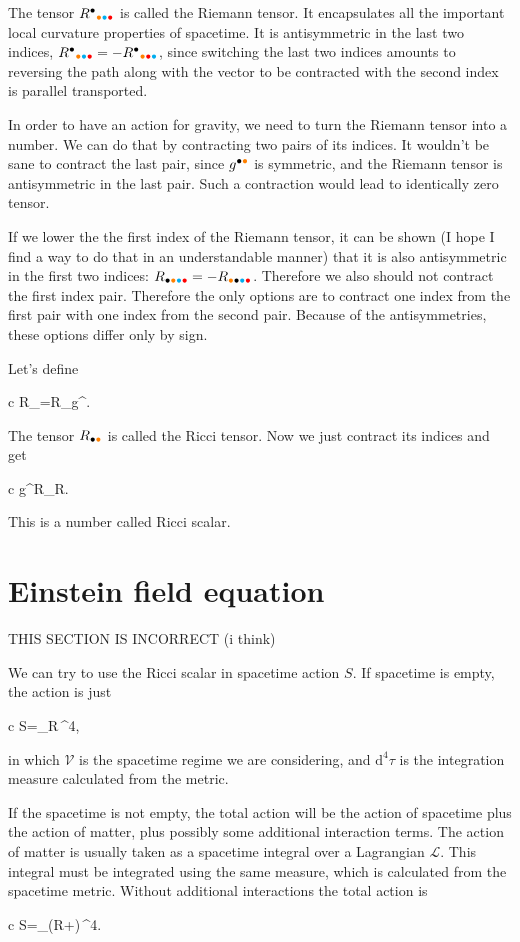 \documentclass[11pt,oneside%
]{memoir}
\newenvironment{eqna}{\begin{IEEEeqnarray*}{c}}{\end{IEEEeqnarray*}\ignorespacesafterend}
\newcommand{\dd}{\mathrm{d}}
\newcommand{\coa}{{\color{black}\bullet}}
\newcommand{\cob}{{\color{oranssi}\bullet}}
\newcommand{\coc}{{\color{cyan}\bullet}}
\newcommand{\cod}{{\color{red}\bullet}}
\begin{document}
The tensor \(R^\coa_{\cob\coc\cod}\) is called the Riemann tensor. It encapsulates all the important local curvature properties of spacetime. It is antisymmetric in the last two indices, \(R^\coa_{\cob\coc\cod}=-R^\coa_{\cob\cod\coc}\), since switching the last two indices amounts to reversing the path along with the vector to be contracted with the second index is parallel transported.

In order to have an action for gravity, we need to turn the Riemann tensor into a number. We can do that by contracting two pairs of its indices. It wouldn't be sane to contract the last pair, since \(g^{\coa\cob}\) is symmetric, and the Riemann tensor is antisymmetric in the last pair. Such a contraction would lead to identically zero tensor.

If we lower the the first index of the Riemann tensor, it can be shown (I hope I find a way to do that in an understandable manner) that it is also antisymmetric in the first two indices: \(R_{\coa\cob\coc\cod}=-R_{\cob\coa\coc\cod}\). Therefore we also should not contract the first index pair. Therefore the only options are to contract one index from the first pair with one index from the second pair. Because of the antisymmetries, these options differ only by sign.

Let's define
\begin{eqna}
R_{\coa\cob}=R_{\coa\coc\cod\cob}g^{\coc\cod}.
\end{eqna}
The tensor \(R_{\coa\cob}\) is called the Ricci tensor. Now we just contract its indices and get
\begin{eqna}
g^{\coa\cob}R_{\coa\cob}\doteq R.
\end{eqna}
This is a number called Ricci scalar.

\section{Einstein field equation}

THIS SECTION IS INCORRECT (i think)

We can try to use the Ricci scalar in spacetime action \(S\). If spacetime is empty, the action is just
\begin{eqna}
S=\int_{}R\,\dd^4\tau,
\end{eqna}
in which \(\mathcal{V}\) is the spacetime regime we are considering, and \(\dd^4\tau\) is the integration measure calculated from the metric.

If the spacetime is not empty, the total action will be the action of spacetime plus the action of matter, plus possibly some additional interaction terms. The action of matter is usually taken as a spacetime integral over a Lagrangian \(\mathcal{L}\). This integral must be integrated using the same measure, which is calculated from the spacetime metric. Without additional interactions the total action is
\begin{eqna}
S=\int_{}(R+)\,\dd^4\tau.
\end{eqna}
\end{document}
